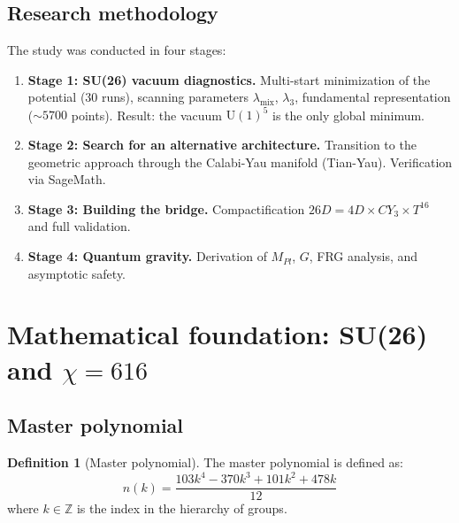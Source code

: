 \documentclass[12pt,a4paper,twoside]{article}
\newcommand{\Uone}{\mathrm{U}(1)}
\theoremstyle{definition}
\newtheorem{definition}{Definition}[section]
\begin{document}
\subsection{Research methodology}

The study was conducted in four stages:

\begin{enumerate}
    \item \textbf{Stage 1: SU(26) vacuum diagnostics.} Multi-start minimization of the potential (30 runs), scanning parameters $\lambda_{\text{mix}}$, $\lambda_3$, fundamental representation ($\sim 5700$ points). Result: the vacuum $\Uone^5$ is the only global minimum.
    
    \item \textbf{Stage 2: Search for an alternative architecture.} Transition to the geometric approach through the Calabi-Yau manifold (Tian-Yau). Verification via SageMath.
    
    \item \textbf{Stage 3: Building the bridge.} Compactification $26D = 4D \times CY_3 \times T^{16}$ and full validation.
    
    \item \textbf{Stage 4: Quantum gravity.} Derivation of $M_{Pl}$, $G$, FRG analysis, and asymptotic safety.
\end{enumerate}

\section{Mathematical foundation: \texorpdfstring{SU(26) and $\chi = 616$}{SU(26) and chi = 616}}
\label{sec:math}

\subsection{Master polynomial}

\begin{definition}[Master polynomial]
The master polynomial is defined as:
\begin{equation}
\boxed{
n(k) = \frac{103k^4 - 370k^3 + 101k^2 + 478k}{12}
}
\label{eq:master_poly}
\end{equation}
where $k \in \mathbb{Z}$ is the index in the hierarchy of groups.
\end{definition}
\end{document}
